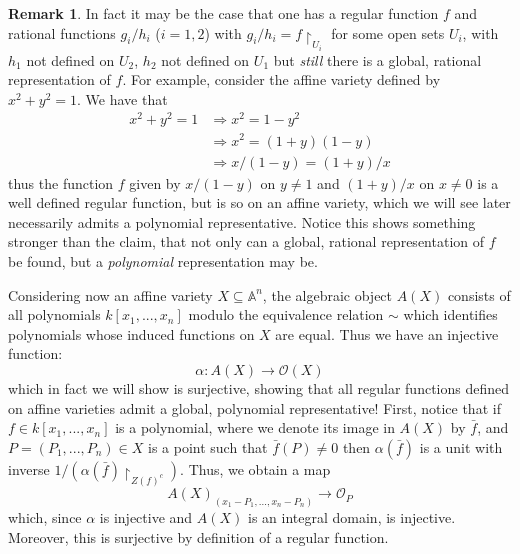 \documentclass[12pt]{article}
\theoremstyle{plain}
\theoremstyle{definition}
\newtheorem{remark}[thm]{Remark}
\newcommand{\bb}[1]{\mathbb{#1}}
\newcommand{\call}[1]{\mathcal{#1}}
\newcommand{\lto}{\longrightarrow}
\begin{document}
\begin{remark}
In fact it may be the case that one has a regular function $f$ and rational functions $g_i/h_i$ ($i = 1,2$) with $g_i/h_i = f\restriction_{U_i}$ for some open sets $U_i$, with $h_1$ not defined on $U_2$, $h_2$ not defined on $U_1$ but \emph{still} there is a global, rational representation of $f$. For example, consider the affine variety defined by $x^2 + y^2 = 1$. We have that
\begin{align*}
    x^2 + y^2 = 1 &\Longrightarrow x^2 = 1 - y^2\\
    &\Longrightarrow x^2 = (1+ y)(1 - y)\\
    &\Longrightarrow x/(1-y) = (1+y)/x
\end{align*}
thus the function $f$ given by $x/(1-y)$ on $y \neq 1$ and $(1+y)/x$ on $x \neq 0$ is a well defined regular function, but is so on an affine variety, which we will see later necessarily admits a polynomial representative. Notice this shows something stronger than the claim, that not only can a global, rational representation of $f$ be found, but a \emph{polynomial} representation may be.
\end{remark}
Considering now an affine variety $X \subseteq \bb{A}^n$, the algebraic object $A(X)$ consists of all polynomials $k[x_1,...,x_n]$ modulo the equivalence relation $\sim$ which identifies polynomials whose induced functions on $X$ are equal. Thus we have an injective function:
\begin{equation}\label{eq:alpha}
    \alpha: A(X) \lto \call{O}(X)
\end{equation}
which in fact we will show is surjective, showing that all regular functions defined on affine varieties admit a global, polynomial representative! First, notice that if $f \in k[x_1,...,x_n]$ is a polynomial, where we denote its image in $A(X)$ by $\bar{f}$, and $P = (P_1,...,P_n) \in X$ is a point such that $\bar{f}(P) \neq 0$ then $\alpha(\bar{f})$ is a unit with inverse $1/(\alpha(\bar{f})\restriction_{Z(f)^c})$. Thus, we obtain a map
\begin{equation}\label{eq:isolocalring}
    A(X)_{(x_1 - P_1,...,x_n - P_n)} \lto \call{O}_{P}
\end{equation}
which, since $\alpha$ is injective and $A(X)$ is an integral domain, is injective. Moreover, this is surjective by definition of a regular function.
\end{document}
